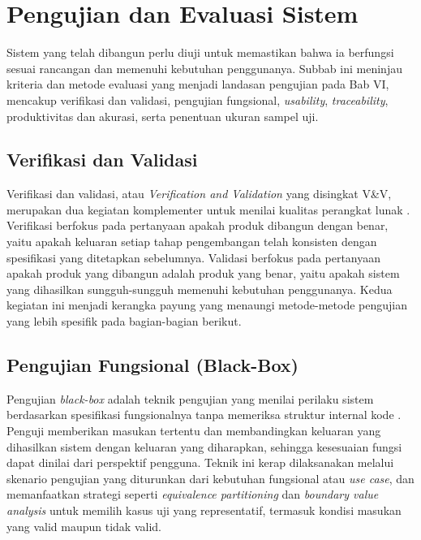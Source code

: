 \section{Pengujian dan Evaluasi Sistem}
\label{sec:pengujian-evaluasi}

Sistem yang telah dibangun perlu diuji untuk memastikan bahwa ia berfungsi sesuai rancangan dan memenuhi kebutuhan penggunanya. Subbab ini meninjau kriteria dan metode evaluasi yang menjadi landasan pengujian pada Bab VI, mencakup verifikasi dan validasi, pengujian fungsional, \textit{usability}, \textit{traceability}, produktivitas dan akurasi, serta penentuan ukuran sampel uji.

\subsection{Verifikasi dan Validasi}

Verifikasi dan validasi, atau \textit{Verification and Validation} yang disingkat V\&V, merupakan dua kegiatan komplementer untuk menilai kualitas perangkat lunak \autocite{ieee2016}. Verifikasi berfokus pada pertanyaan apakah produk dibangun dengan benar, yaitu apakah keluaran setiap tahap pengembangan telah konsisten dengan spesifikasi yang ditetapkan sebelumnya. Validasi berfokus pada pertanyaan apakah produk yang dibangun adalah produk yang benar, yaitu apakah sistem yang dihasilkan sungguh-sungguh memenuhi kebutuhan penggunanya. Kedua kegiatan ini menjadi kerangka payung yang menaungi metode-metode pengujian yang lebih spesifik pada bagian-bagian berikut.

\subsection{Pengujian Fungsional (Black-Box)}

Pengujian \textit{black-box} adalah teknik pengujian yang menilai perilaku sistem berdasarkan spesifikasi fungsionalnya tanpa memeriksa struktur internal kode \autocite{nidhra2012}. Penguji memberikan masukan tertentu dan membandingkan keluaran yang dihasilkan sistem dengan keluaran yang diharapkan, sehingga kesesuaian fungsi dapat dinilai dari perspektif pengguna. Teknik ini kerap dilaksanakan melalui skenario pengujian yang diturunkan dari kebutuhan fungsional atau \textit{use case}, dan memanfaatkan strategi seperti \textit{equivalence partitioning} dan \textit{boundary value analysis} untuk memilih kasus uji yang representatif, termasuk kondisi masukan yang valid maupun tidak valid.

